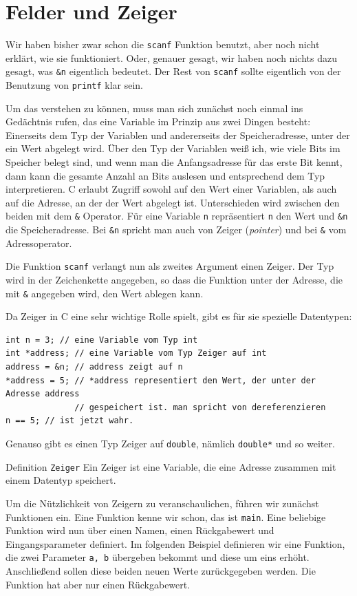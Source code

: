 
\section{Felder und Zeiger}

Wir haben bisher zwar schon die \verb|scanf| Funktion benutzt, aber noch nicht erklärt, wie sie funktioniert.
Oder, genauer gesagt, wir haben noch nichts dazu gesagt, was \verb|&n| eigentlich bedeutet.
Der Rest von \verb|scanf| sollte eigentlich von der Benutzung von \verb|printf| klar sein.

Um das verstehen zu können, muss man sich zunächst noch einmal ins Gedächtnis rufen, das eine Variable im Prinzip aus zwei Dingen besteht:
Einerseits dem Typ der Variablen und andererseits der Speicheradresse, unter der ein Wert abgelegt wird.
Über den Typ der Variablen weiß ich, wie viele Bits im Speicher belegt sind, und wenn man die Anfangsadresse für das erste Bit kennt, dann kann die gesamte Anzahl an Bits auslesen und entsprechend dem Typ interpretieren.
C erlaubt Zugriff sowohl auf den Wert einer Variablen, als auch auf die Adresse, an der der Wert abgelegt ist.
Unterschieden wird zwischen den beiden mit dem \verb|&| Operator.
Für eine Variable \verb|n| repräsentiert \verb|n| den Wert und \verb|&n| die Speicheradresse.
Bei \verb|&n| spricht man auch von Zeiger (\emph{pointer}) und bei \verb|&| vom Adressoperator.

Die Funktion \verb|scanf| verlangt nun als zweites Argument einen Zeiger.
Der Typ wird in der Zeichenkette angegeben, so dass die Funktion unter der Adresse, die mit \verb|&| angegeben wird, den Wert ablegen kann.

Da Zeiger in C eine sehr wichtige Rolle spielt, gibt es für sie spezielle Datentypen:
\begin{lstlisting}
int n = 3; // eine Variable vom Typ int
int *address; // eine Variable vom Typ Zeiger auf int
address = &n; // address zeigt auf n
*address = 5; // *address representiert den Wert, der unter der Adresse address
              // gespeichert ist. man spricht von dereferenzieren
n == 5; // ist jetzt wahr.
\end{lstlisting}
Genauso gibt es einen Typ Zeiger auf \verb|double|, nämlich \verb|double*| und so weiter.
\begin{myblock}{Definition \texttt{Zeiger}}
Ein Zeiger ist eine Variable, die eine Adresse zusammen mit einem Datentyp speichert.
\end{myblock}
Um die Nützlichkeit von Zeigern zu veranschaulichen, führen wir zunächst Funktionen ein.
Eine Funktion kenne wir schon, das ist \verb|main|.
Eine beliebige Funktion wird nun über einen Namen, einen Rückgabewert und Eingangsparameter definiert.
Im folgenden Beispiel definieren wir eine Funktion, die zwei Parameter \verb|a, b| übergeben bekommt und diese um eins erhöht.
Anschließend sollen diese beiden neuen Werte zurückgegeben werden.
Die Funktion hat aber nur einen Rückgabewert.

